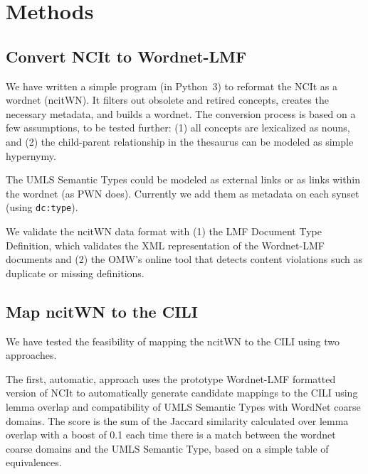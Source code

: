 \documentclass[11pt]{article}
\begin{document}
\section{Methods}

\subsection{Convert NCIt to Wordnet-LMF} 

We have written a simple program (in Python~3) to reformat the NCIt as a wordnet (ncitWN).  It filters out obsolete and retired concepts, creates the necessary metadata, and builds a wordnet.  The conversion process is based on a few assumptions, to be tested further: (1) all concepts are lexicalized as nouns, and (2) the child-parent relationship in the thesaurus can be modeled as simple hypernymy.

The UMLS Semantic Types could be modeled as external links or as links within the wordnet (as PWN does).  Currently we add them as metadata on each synset (using \texttt{dc:type}).

We  validate the ncitWN data format with (1) the LMF Document Type Definition, which validates the XML representation of the Wordnet-LMF documents \citep{vossen2016toward} and (2) the OMW’s online tool \citep{da2015omwedit,tan2011building} that detects content violations such as duplicate or missing definitions.

\subsection{Map ncitWN to the CILI} %
We have tested the feasibility of mapping the ncitWN to the CILI using two approaches. 

The first, automatic, approach uses the prototype Wordnet-LMF formatted version of NCIt to automatically generate candidate mappings to the CILI using lemma overlap and compatibility of UMLS Semantic Types with WordNet coarse domains.  The score is the sum of the Jaccard similarity calculated over lemma overlap with a boost of 0.1 each time there is a match between the wordnet coarse domains and the UMLS Semantic Type, based on a simple table of equivalences.
\end{document}
